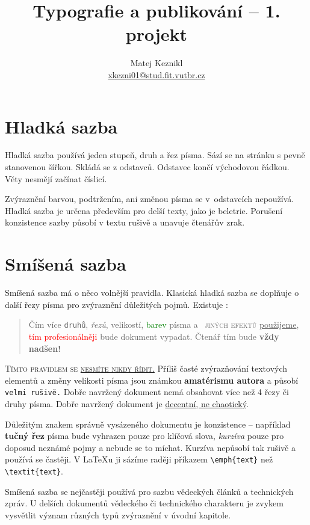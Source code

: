 \documentclass[10pt, a4paper, twocolumn]{article}
\title{Typografie a publikování – 1. projekt}
\author{Matej Keznikl \\ \href{mailto:xkezni01@stud.fit.vutbr.cz}{xkezni01@stud.fit.vutbr.cz}}
\date{}
\begin{document}
\maketitle

\section{Hladká sazba}
Hladká sazba používá jeden stupeň, druh a řez písma.
Sází se na stránku s pevně stanovenou šířkou.
Skládá se z odstavců. Odstavec končí východovou řádkou.
Věty nesmějí začínat číslicí.

Zvýraznění barvou, podtržením, ani změnou písma se v~odstavcích nepoužívá.
Hladká sazba je určena především pro delší texty, jako je beletrie.
Porušení konzistence sazby působí v textu rušivě a unavuje čtenářův zrak.

\section{Smíšená sazba}
\label{section: Smisena sazba}
Smíšená sazba má o něco volnější pravidla.
Klasická hladká sazba se doplňuje o další řezy písma pro zvýraznění důležitých pojmů.
Existuje :

\begin{quotation}
Čím více \texttt{druhů}, \emph{řezů}, {\tiny velikostí}, \textcolor{green}{barev} písma a~\textsc{\color{blue} jiných efektů} \underline{použijeme}, \textcolor{red}{tím profesionálněji} bude {\selectfont dokument} vypadat.
Čtenář tím bude \textbf{\huge vždy nadšen!}
\end{quotation}

\textsc{Tímto pravidlem se \underline{nesmíte nikdy řídit.}}
Příliš časté zvýrazňování textových elementů a změny {\scriptsize velikosti} písma jsou známkou \textbf{amatérismu autora} a působí \texttt{velmi rušivě.}
Dobře navržený dokument nemá obsahovat více než 4 řezy či druhy písma.
Dobře navržený dokument je \underline{decentní, ne chaotický}.

Důležitým znakem správně vysázeného dokumentu je konzistence -- například \textbf{tučný řez} písma bude vyhrazen pouze pro klíčová slova, \emph{kurzíva} pouze pro doposud neznámé pojmy a nebude se to míchat.
Kurzíva nepůsobí tak rušivě a používá se častěji.
V \LaTeX u ji sázíme raději příkazem \verb|\emph{text}| než \verb|\textit{text}|.

Smíšená sazba se nejčastěji používá pro sazbu vědeckých článků a technických zpráv.
U delších dokumentů vědeckého či technického charakteru je zvykem vysvětlit význam různých typů zvýraznění v úvodní kapitole.
\end{document}
